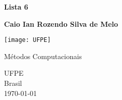 \begin{titlepage}
	\begin{center}
		\Huge
		\textbf{Lista 6}	

		\vspace{0.5cm}
		\LARGE
		
		\textbf{Caio Ian Rozendo Silva de Melo}
			
		\vfill
		\texttt{[image: UFPE]}
		\vfill

		Métodos Computacionais

		\vspace{0.8cm}


		\Large
		UFPE\\
		Brasil\\
		\today

	\end{center}
\end{titlepage}
